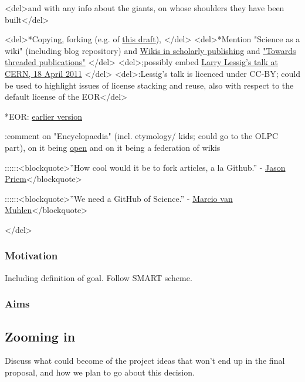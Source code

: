 \documentclass[final,authoryear,3p]{elsarticle-open-drafting}
\begin{document}
<del>and with any info about the giants, on whose shoulders they have been built</del>

<del>*Copying, forking (e.g. of \href{http://species-id.net/w/index.php?title=Draft:Encyclopaedia_of_original_research&diff=prev&oldid=5076}{this draft}), </del>
<del>*Mention "Science as a wiki" (including blog repository) and \href{http://species-id.net/wiki/Wikis_in_scholarly_publishing}{Wikis in scholarly publishing} and \href{http://friendfeed.com/cameronneylon/c476db70/imo-this-is-possibly-single-most-useful-thing-we}{"Towards threaded publications"} </del>
<del>;possibly embed \href{http://vimeo.com/22633948}{Larry Lessig's talk at CERN, 18 April 2011} </del>
<del>:Lessig's talk is licenced under CC-BY; could be used to highlight issues of license stacking and reuse, also with respect to the default license of the EOR</del>

*EOR: \href{http://www.science3point0.com/coaspedia/index.php/Proposals:Wikimedia_Deutschland/2010/Wissenswert/Wissenschaft_als_Wiki/English}{earlier version}


:comment on "Encyclopaedia" (incl. etymology/ kids; could go to the OLPC part), on it being \href{http://www.opendefinition.org/}{open} and on it being a federation of wikis


::::::<blockquote>''How cool would it be to fork articles, a la Github.'' - \href{http://friendfeed.com/cameronneylon/c476db70/imo-this-is-possibly-single-most-useful-thing-we}{Jason Priem}</blockquote>

::::::<blockquote>''We need a GitHub of Science.'' - \href{http://marciovm.com/i-want-a-github-of-science}{Marcio van Muhlen}</blockquote>

</del>
\subsubsection{Motivation}
Including definition of goal. Follow SMART scheme.

\subsubsection{Aims}

\subsection{Zooming in}
Discuss what could become of the project ideas that won't end up in the final proposal, and how we plan to go about this decision.
\end{document}
